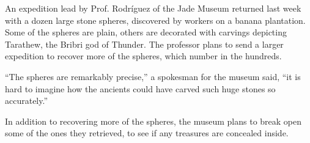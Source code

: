 
An expedition lead by Prof. Rodríguez of the Jade Museum returned last
week with a dozen large stone spheres, discovered by workers on a
banana plantation.  Some of the spheres are plain, others are
decorated with carvings depicting Tarathew, the Bribri god of Thunder.
The professor plans to send a larger expedition to recover more of the
spheres, which number in the hundreds.

``The spheres are remarkably precise,'' a spokesman for the museum
said, ``it is hard to imagine how the ancients could have carved such
huge stones so accurately.''

In addition to recovering more of the spheres, the museum plans to
break open some of the ones they retrieved, to see if any treasures
are concealed inside.

